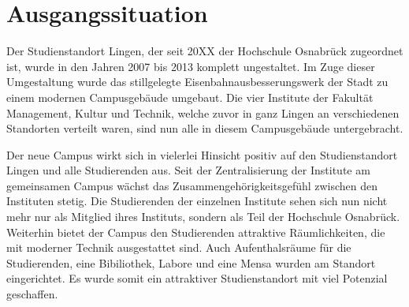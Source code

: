 \section{Ausgangssituation}
\label{sec:Ausgangssituation}

Der Studienstandort Lingen, der seit 20XX der Hochschule Osnabrück zugeordnet
ist, wurde in den Jahren 2007 bis 2013 komplett ungestaltet. Im Zuge dieser
Umgestaltung wurde das stillgelegte Eisenbahnausbesserungswerk der Stadt zu
einem modernen Campusgebäude umgebaut. Die vier Institute der Fakultät
Management, Kultur und Technik, welche zuvor in ganz Lingen an verschiedenen
Standorten verteilt waren, sind nun alle in diesem Campusgebäude untergebracht.

Der neue Campus wirkt sich in vielerlei Hinsicht positiv auf den
Studienstandort Lingen und alle Studierenden aus. Seit der Zentralisierung der
Institute am gemeinsamen Campus wächst das Zusammengehörigkeitsgefühl zwischen
den Instituten stetig. Die Studierenden der einzelnen Institute sehen sich nun
nicht mehr nur als Mitglied ihres Instituts, sondern als Teil der Hochschule
Osnabrück. Weiterhin bietet der Campus den Studierenden attraktive
Räumlichkeiten, die mit moderner Technik ausgestattet sind. Auch Aufenthalsräume
für die Studierenden, eine Bibiliothek, Labore und eine Mensa wurden am Standort
eingerichtet. Es wurde somit ein attraktiver Studienstandort mit viel Potenzial
geschaffen.